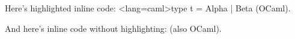 Here's highlighted inline code: \code<lang=caml>{type t = Alpha | Beta} (OCaml).

And here's inline code without highlighting:  (also OCaml).

